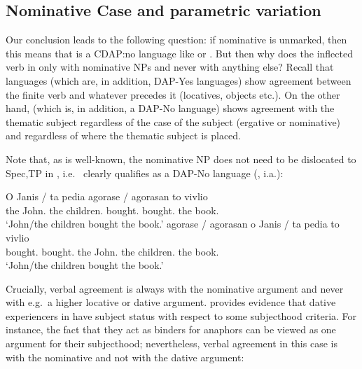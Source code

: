 \documentclass[output=paper]{langsci/langscibook}
\begin{document}
\begin{exe}
\section{Nominative Case and parametric variation}\label{sec:key:13.4}

Our conclusion leads to the following question: if nominative is unmarked, then this means that  is a \gls{CDAP}:no language
like  or . But then why does the inflected verb in
 only  with nominative NPs and never
with anything else? Recall that  languages (which are, in addition,
DAP-Yes languages) show agreement between the finite verb and whatever precedes
it (locatives, objects etc.). On the other hand,  (which is, in
addition, a DAP-No language) shows agreement with the thematic subject
regardless of the case of the subject (ergative or nominative) and regardless of where the thematic subject is placed.

Note that, as is well-known, the nominative NP does not need to be dislocated
to Spec,TP in , i.e.\  clearly qualifies as a DAP-No language
(\citealt{AleAna1998}, i.a.):%

\ea%
\label{ex:key:13.32}
	\ea
	\gll  O Janis / ta pedia agorase / agorasan to vivlio\\
    the John.\Nom{} {} the children.\Nom{} bought.\Tsg{} {} bought.\Tpl{}  the book.\Acc{}\\
	\glt     ‘John/the children bought the book.’
	\ex
	\gll  agorase / agorasan o Janis / ta pedia to vivlio\\
    bought.\Tsg{} {} bought.\Tpl{} the John.\Nom{} {} the children.\Nom{}  the book.\Acc{}\\
	\glt     ‘John/the children bought the book.’
    \z
\z

Crucially, verbal agreement is always with the nominative
argument and never with e.g.\ a higher locative or dative
argument. \citet{Anagnostopoulou1999} provides evidence that dative experiencers in  have subject status with respect to some
subjecthood criteria. For instance, the fact that they act as binders for
anaphors can be viewed as one argument for their subjecthood; nevertheless,
verbal agreement in this case is with the nominative and
not with the dative argument:


\end{exe}
\end{document}

